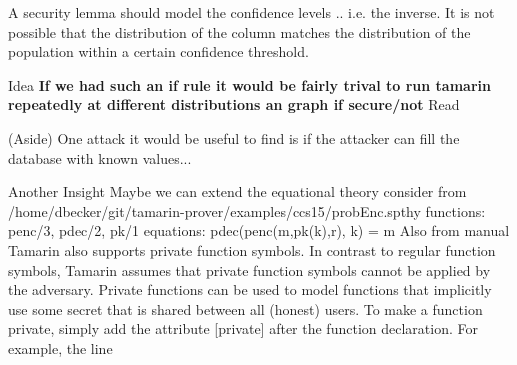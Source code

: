 \documentclass[journal]{IEEEtran}
\begin{document}
A security lemma should model the confidence levels .. i.e. the inverse. It is not possible that the distribution of the column matches the distribution of the population within a certain confidence threshold.

Idea
\textbf{If we had such an if rule it would be fairly trival to run tamarin repeatedly at different distributions an graph if secure/not
}
Read \cite{Ismal2012}










(Aside) One attack it would be useful to find  is if the attacker can fill the database with known values...








Another Insight
Maybe we can extend the equational theory
consider from
/home/dbecker/git/tamarin-prover/examples/ccs15/probEnc.spthy
	functions: penc/3, pdec/2, pk/1
	equations: pdec(penc(m,pk(k),r), k) = m
Also from manual
Tamarin also supports private function symbols. In contrast to regular function symbols, Tamarin
assumes that private function symbols cannot be applied by the adversary. Private functions can
be used to model functions that implicitly use some secret that is shared between all (honest) users.
To make a function private, simply add the attribute [private] after the function declaration. For
example, the line
\end{document}
